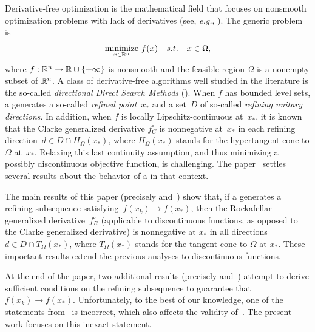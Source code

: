 Derivative-free optimization is the mathematical field that focuses on nonsmooth optimization problems with lack of derivatives (see, \textit{e.g.}, \cite{AlAuGhKoLed2020,AuHa2017,CoScVibook}).
The generic problem is
\begin{equation*}
	\underset{x \in \mathbb{R}^n}{\operatorname*{minimize}}~ f(x) \quad s.t. \quad x \in \Omega,
\end{equation*}
where $f:\mathbb{R}^n \to \mathbb{R}\cup\{+\infty\}$ is nonsmooth and the feasible region $\Omega$ is a nonempty subset of $\mathbb{R}^n$.
A class of derivative-free algorithms well studied in the literature is the so-called \textit{directional Direct Search Methods} (\ddsm).
When $f$ has bounded level sets, a \ddsm generates a so-called \textit{refined point}~$x_*$ and a set~$D$ of so-called \textit{refining unitary directions}.
In addition, when $f$ is locally Lipschitz-continuous at~$x_*$, it is known that the Clarke generalized derivative $f^\circ_C$ is nonnegative at~$x_*$ in each refining direction~$d \in D \cap H_\Omega(x_*)$, where $H_\Omega(x_*)$ stands for the hypertangent cone to $\Omega$ at~$x_*$.
Relaxing this last continuity assumption, and thus minimizing a possibly discontinuous objective function, is challenging.
The paper~\cite{ViCu2012} settles several results about the behavior of a \ddsm in that context.

The main results of this paper (precisely \cite[Theorem~3.1]{ViCu2012} and~\cite[Theorem~3.2]{ViCu2012}) show that, if a \ddsm generates a refining subsequence satisfying~$f(x_k) \to f(x_*)$, then the Rockafellar generalized derivative~$f^\circ_R$ (applicable to discontinuous functions, as opposed to the Clarke generalized derivative) is nonnegative at $x_*$ in all directions $d \in D \cap T_\Omega(x_*)$, where $T_\Omega(x_*)$ stands for the tangent cone to $\Omega$ at $x_*$.
These important results extend the previous analyses to discontinuous functions.

At the end of the paper, two additional results (precisely \cite[Theorem~4.1]{ViCu2012} and~\cite[Corollary~4.1]{ViCu2012}) attempt to derive sufficient conditions on the refining subsequence to guarantee that~$f(x_k) \to f(x_*)$.
Unfortunately, to the best of our knowledge, one of the statements from~\cite[Theorem~4.1]{ViCu2012} is incorrect, which also affects the validity of~\cite[Corollary~4.1]{ViCu2012}.
The present work focuses on this inexact statement.

